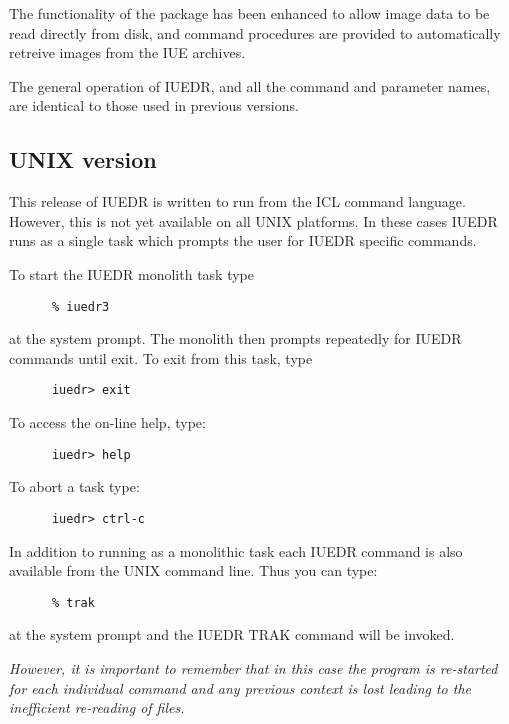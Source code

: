 The functionality of the package has been enhanced to allow image data
to be read directly from disk, and command procedures are provided to 
automatically retreive images from the IUE archives.

The general operation of IUEDR, and all the command and parameter
names, are identical to those used in previous versions.

\subsection{UNIX version}

This release of IUEDR is written to run from the ICL command language.
However, this is not yet available on all UNIX platforms. In these
cases IUEDR runs as a single task which prompts the user for IUEDR
specific commands.

To start the IUEDR monolith task type 

\begin{verbatim}
      % iuedr3
\end{verbatim}

at the system prompt. The monolith then prompts repeatedly for IUEDR
commands until exit. To exit from this task, type 

\begin{verbatim}
      iuedr> exit
\end{verbatim}

To access the on-line help, type:

\begin{verbatim}
      iuedr> help
\end{verbatim}

To abort a task type:

\begin{verbatim}
      iuedr> ctrl-c
\end{verbatim}

In addition to running as a monolithic task each IUEDR command is also
available from the UNIX command line. Thus you can type:

\begin{verbatim}
      % trak
\end{verbatim}

at the system prompt and the IUEDR TRAK command will be invoked.

{\em However, it is important to remember that in this case the
program is re-started for each individual command and any previous
context is lost leading to the inefficient re-reading of files.}

